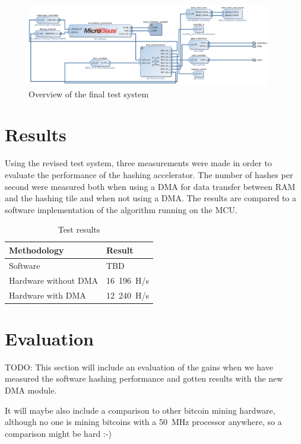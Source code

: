 \begin{figure}
	\includegraphics[width=0.95\textwidth]{Figures/testsystem-vivado-final.png}
	\caption{Overview of the final test system}
	\label{fig:testsystem-vivado-final}
\end{figure}

\section{Results}

Using the revised test system, three measurements were made in order to evaluate the
performance of the hashing accelerator. The number of hashes per second were measured
both when using a DMA for data transfer between RAM and the hashing tile and when not
using a DMA. The results are compared to a software implementation of the algorithm
running on the MCU.

\begin{table}[ht]
	\centering
	\begin{tabular}{|l|l|}
		\hline
		\textbf{Methodology} & \textbf{Result} \\
		\hline
		Software & TBD \\
		Hardware without DMA & 16~196~H/s\\
		Hardware with DMA & 12~240~H/s\\
		\hline
	\end{tabular}

	\caption{Test results}
\end{table}

\section{Evaluation}

TODO:
This section will include an evaluation of the gains when we have measured the software
hashing performance and gotten results with the new DMA module.

It will maybe also include a comparison to other bitcoin mining hardware, although
no one is mining bitcoins with a 50~MHz processor anywhere, so a comparison might
be hard :-)


